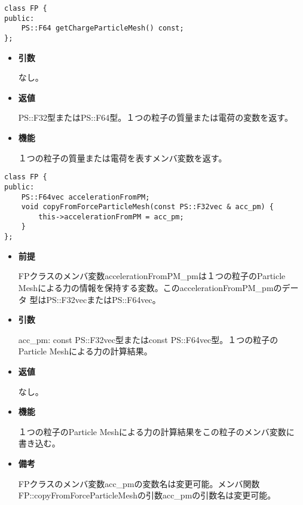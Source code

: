 \begin{screen}
\begin{verbatim}
class FP {
public:
    PS::F64 getChargeParticleMesh() const;
};
\end{verbatim}
\end{screen}

\begin{itemize}

\item {\bf 引数}

  なし。

\item {\bf 返値}

  PS::F32型またはPS::F64型。１つの粒子の質量または電荷の変数を返す。
  
\item {\bf 機能}

  １つの粒子の質量または電荷を表すメンバ変数を返す。

\end{itemize}



\begin{screen}
\begin{verbatim}
class FP {
public:
    PS::F64vec accelerationFromPM;
    void copyFromForceParticleMesh(const PS::F32vec & acc_pm) {
        this->accelerationFromPM = acc_pm;
    }
};
\end{verbatim}
\end{screen}

\begin{itemize}

\item {\bf 前提}

  FPクラスのメンバ変数accelerationFromPM\_pmは１つの粒子のParticle
  Meshによる力の情報を保持する変数。このaccelerationFromPM\_pmのデータ
  型はPS::F32vecまたはPS::F64vec。

\item {\bf 引数}

  acc\_pm: const PS::F32vec型またはconst PS::F64vec型。１つの粒子の
  Particle Meshによる力の計算結果。

\item {\bf 返値}

  なし。
  
\item {\bf 機能}

  １つの粒子のParticle Meshによる力の計算結果をこの粒子のメンバ変数に
  書き込む。
  
\item {\bf 備考}

  FPクラスのメンバ変数acc\_pmの変数名は変更可能。メンバ関数
  FP::copyFromForceParticleMeshの引数acc\_pmの引数名は変更可能。

\end{itemize}
\fi

